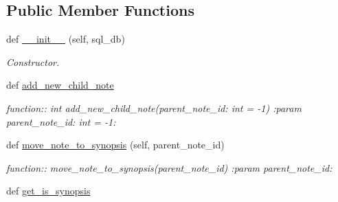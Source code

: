 \subsection*{Public Member Functions}
\begin{DoxyCompactItemize}
\item 
def \hyperlink{classplume-creator_1_1src_1_1plume_1_1data_1_1tree_1_1note__tree_1_1_note_tree_a7b82f73f179ef6340a82adb54e0298e0}{\+\_\+\+\_\+init\+\_\+\+\_\+} (self, sql\+\_\+db)\hypertarget{classplume-creator_1_1src_1_1plume_1_1data_1_1tree_1_1note__tree_1_1_note_tree_a7b82f73f179ef6340a82adb54e0298e0}{}\label{classplume-creator_1_1src_1_1plume_1_1data_1_1tree_1_1note__tree_1_1_note_tree_a7b82f73f179ef6340a82adb54e0298e0}

\begin{DoxyCompactList}\small\item\em Constructor. \end{DoxyCompactList}\item 
def \hyperlink{classplume-creator_1_1src_1_1plume_1_1data_1_1tree_1_1note__tree_1_1_note_tree_a9d6e820bbd709a50f74c929dde8a8352}{add\+\_\+new\+\_\+child\+\_\+note}\hypertarget{classplume-creator_1_1src_1_1plume_1_1data_1_1tree_1_1note__tree_1_1_note_tree_a9d6e820bbd709a50f74c929dde8a8352}{}\label{classplume-creator_1_1src_1_1plume_1_1data_1_1tree_1_1note__tree_1_1_note_tree_a9d6e820bbd709a50f74c929dde8a8352}

\begin{DoxyCompactList}\small\item\em function\+:\+: int add\+\_\+new\+\_\+child\+\_\+note(parent\+\_\+note\+\_\+id\+: int = -\/1) \+:param parent\+\_\+note\+\_\+id\+: int = -\/1\+: \end{DoxyCompactList}\item 
def \hyperlink{classplume-creator_1_1src_1_1plume_1_1data_1_1tree_1_1note__tree_1_1_note_tree_abd22d2e69f638105302eaba4e05179d3}{move\+\_\+note\+\_\+to\+\_\+synopsis} (self, parent\+\_\+note\+\_\+id)\hypertarget{classplume-creator_1_1src_1_1plume_1_1data_1_1tree_1_1note__tree_1_1_note_tree_abd22d2e69f638105302eaba4e05179d3}{}\label{classplume-creator_1_1src_1_1plume_1_1data_1_1tree_1_1note__tree_1_1_note_tree_abd22d2e69f638105302eaba4e05179d3}

\begin{DoxyCompactList}\small\item\em function\+:\+: move\+\_\+note\+\_\+to\+\_\+synopsis(parent\+\_\+note\+\_\+id) \+:param parent\+\_\+note\+\_\+id\+: \end{DoxyCompactList}\item 
def \hyperlink{classplume-creator_1_1src_1_1plume_1_1data_1_1tree_1_1note__tree_1_1_note_tree_a501937c043c6a754a9edc8f9b94ab6d8}{get\+\_\+is\+\_\+synopsis}\hypertarget{classplume-creator_1_1src_1_1plume_1_1data_1_1tree_1_1note__tree_1_1_note_tree_a501937c043c6a754a9edc8f9b94ab6d8}{}\label{classplume-creator_1_1src_1_1plume_1_1data_1_1tree_1_1note__tree_1_1_note_tree_a501937c043c6a754a9edc8f9b94ab6d8}


\end{DoxyCompactItemize}
